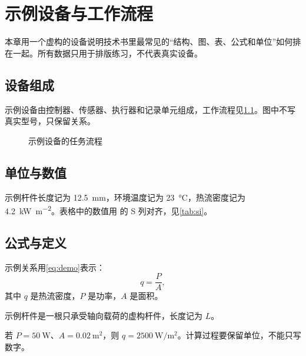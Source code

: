 \chapter{示例设备与工作流程}\label{ch:device}

本章用一个虚构的设备说明技术书里最常见的“结构、图、表、公式和单位”如何排在一起。所有数据只用于排版练习，不代表真实设备。

\section{设备组成}

示例设备由控制器、传感器、执行器和记录单元组成，工作流程见\cref{fig:process}。图中不写真实型号，只保留关系。

\begin{figure}[htbp]
  \centering
  
  \caption{示例设备的任务流程}\label{fig:process}
\end{figure}

\section{单位与数值}

示例杆件长度记为 \qty{12.5}{\milli\metre}，环境温度记为 \qty{23}{\celsius}，热流密度记为 \qty{4.2}{\kilo\watt\per\square\metre}。表格中的数值用  的 S 列对齐，见\cref{tab:si}。

\begin{table}[htbp]
  \centering
  \caption{示例测量值与单位}\label{tab:si}
  
\end{table}

\section{公式与定义}

示例关系用\cref{eq:demo}表示：
\begin{equation}\label{eq:demo}
  q = \frac{P}{A},
\end{equation}
其中 $q$ 是热流密度，$P$ 是功率，$A$ 是面积。

\begin{definition}[示例杆件]
  示例杆件是一根只承受轴向载荷的虚构杆件，长度记为 $L$。
\end{definition}

\begin{example}
  若 $P=\qty{50}{\watt}$、$A=\qty{0.02}{\square\metre}$，则 $q=\qty{2500}{\watt\per\square\metre}$。计算过程要保留单位，不能只写数字。
\end{example}

